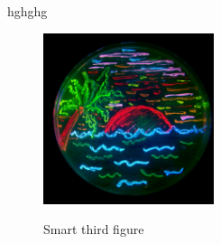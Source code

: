 hghghg

\begin{figure}
  \includegraphics[width=5cm]{pictureprotein.jpg}
  \label{fig:pic}
  \caption{Smart third figure}
\end{figure}




